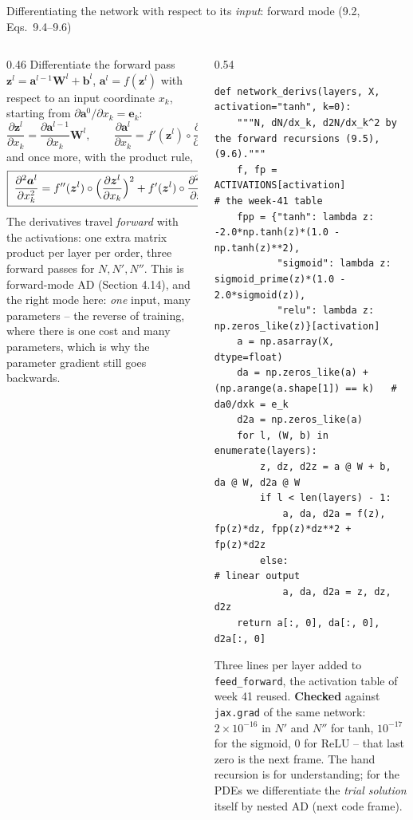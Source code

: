 \documentclass[10pt,aspectratio=169]{beamer}
\begin{document}
\begin{frame}[fragile]{Differentiating the network with respect to its \emph{input}: forward mode (9.2, Eqs.~9.4--9.6)}
\vspace{-3pt}
\begin{columns}[T]
\begin{column}{0.46\textwidth}
\scriptsize
Differentiate the forward pass $\bm{z}^{l}=\bm{a}^{l-1}\bm{W}^{l}+\bm{b}^{l}$,
$\bm{a}^{l}=f(\bm{z}^{l})$ with respect to an input coordinate $x_k$, starting
from $\partial\bm{a}^{0}/\partial x_k=\bm{e}_k$:
\[
  \frac{\partial\bm{z}^{l}}{\partial x_k}=\frac{\partial\bm{a}^{l-1}}{\partial x_k}\bm{W}^{l},\qquad
  \frac{\partial\bm{a}^{l}}{\partial x_k}=f'(\bm{z}^{l})\circ\frac{\partial\bm{z}^{l}}{\partial x_k}\quad(9.5)
\]
and once more, with the product rule,
\[
  \boxed{\;\frac{\partial^{2}\bm{a}^{l}}{\partial x_k^{2}}
  =f''(\bm{z}^{l})\circ\Bigl(\frac{\partial\bm{z}^{l}}{\partial x_k}\Bigr)^{2}
  +f'(\bm{z}^{l})\circ\frac{\partial^{2}\bm{z}^{l}}{\partial x_k^{2}}\;}\quad(9.6)
\]
The derivatives travel \emph{forward} with the activations: one extra matrix
product per layer per order, three forward passes for $N,N',N''$.  This is
forward-mode AD (Section 4.14), and the right mode here: \emph{one} input,
many parameters -- the reverse of training, where there is one cost and many
parameters, which is why the parameter gradient still goes backwards.
\end{column}
\begin{column}{0.54\textwidth}
\lstset{basicstyle=\ttfamily\tiny}
\begin{lstlisting}
def network_derivs(layers, X, activation="tanh", k=0):
    """N, dN/dx_k, d2N/dx_k^2 by the forward recursions (9.5), (9.6)."""
    f, fp = ACTIVATIONS[activation]            # the week-41 table
    fpp = {"tanh": lambda z: -2.0*np.tanh(z)*(1.0 - np.tanh(z)**2),
           "sigmoid": lambda z: sigmoid_prime(z)*(1.0 - 2.0*sigmoid(z)),
           "relu": lambda z: np.zeros_like(z)}[activation]
    a = np.asarray(X, dtype=float)
    da = np.zeros_like(a) + (np.arange(a.shape[1]) == k)   # da0/dxk = e_k
    d2a = np.zeros_like(a)
    for l, (W, b) in enumerate(layers):
        z, dz, d2z = a @ W + b, da @ W, d2a @ W
        if l < len(layers) - 1:
            a, da, d2a = f(z), fp(z)*dz, fpp(z)*dz**2 + fp(z)*d2z
        else:                                   # linear output
            a, da, d2a = z, dz, d2z
    return a[:, 0], da[:, 0], d2a[:, 0]
\end{lstlisting}
\scriptsize
Three lines per layer added to \texttt{feed\_forward}, the activation table
of week 41 reused.  \textbf{Checked} against \texttt{jax.grad} of the same
network: $2\times10^{-16}$ in $N'$ and $N''$ for tanh, $10^{-17}$ for the
sigmoid, $0$ for ReLU -- that last zero is the next frame.  The hand
recursion is for understanding; for the PDEs we differentiate the
\emph{trial solution} itself by nested AD (next code frame).
\end{column}
\end{columns}
\end{frame}
\end{document}
